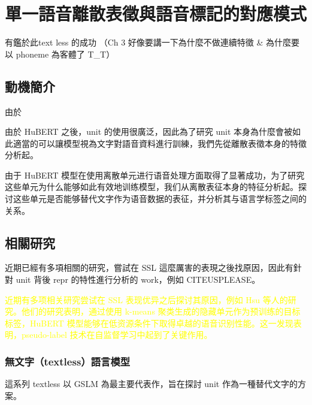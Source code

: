 % 

\chapter{單一語音離散表徵與語音標記的對應模式}


有鑑於此text less 的成功
（Ch 3 好像要講一下為什麼不做連續特徵 \& 為什麼要以 phoneme 為客體了 T\_T） 

\section{動機簡介}  %

由於


由於 HuBERT 之後，unit 的使用很廣泛，因此為了研究 unit 本身為什麼會被如此適當的可以讓模型視為文字對語音資料進行訓練，我們先從離散表徵本身的特徵分析起。 

由于 HuBERT 模型在使用离散单元进行语音处理方面取得了显著成功，为了研究这些单元为什么能够如此有效地训练模型，我们从离散表征本身的特征分析起。探讨这些单元是否能够替代文字作为语音数据的表征，并分析其与语言学标签之间的关系。 

\textcolor{yellow}{}

\textcolor{yellow}{}


\section{相關研究}

近期已經有多項相關的研究，嘗試在 SSL 這麼厲害的表現之後找原因，因此有針對 unit 背後 repr 的特性進行分析的 work，例如 CITEUSPLEASE。 

\textcolor{yellow}{近期有多项相关研究尝试在 SSL 表现优异之后探讨其原因，例如 Hsu 等人的研究。他们的研究表明，通过使用 k-means 聚类生成的隐藏单元作为预训练的目标标签，HuBERT 模型能够在低资源条件下取得卓越的语音识别性能。这一发现表明，pseudo-label 技术在自监督学习中起到了关键作用。}



\subsection{無文字（textless）語言模型}

這系列 textless 以 GSLM 為最主要代表作，旨在探討 unit 作為一種替代文字的方案。

